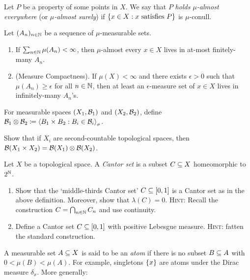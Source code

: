 \documentclass[reqno, twoside]{article}
\begin{document}
    Let $P$ be a property of some points in $X$. We say that $P$ \textit{holds $\mu$-almost everywhere} (or \textit{$\mu$-almost surely}) if $\left\{x\in X: x\textrm{ satisfies }P\right\}$ is $\mu$-conull.

    \begin{exercise}
        Let $(A_n)_{n\in\mathbb{N}}$ be a sequence of $\mu$-measurable sets.
        \begin{enumerate}
            \item If $\sum_{n\in\mathbb{N}}\mu(A_n)<\infty$, then $\mu$-almost every $x\in X$ lives in at-most finitely-many $A_n$.
                \vspace{-0.05in}
            \item (Measure Compactness). If $\mu(X)<\infty$ and there exists $\epsilon>0$ such that $\mu(A_n)\geq\epsilon$ for all $n\in\mathbb{N}$, then at least an $\epsilon$-measure set of $x\in X$ lives in infinitely-many $A_n$'s.
        \end{enumerate}
    \end{exercise}

    For measurable spaces $(X_1,\mathcal{B}_1)$ and $(X_2,\mathcal{B}_2)$, define $\mathcal{B}_1\otimes\mathcal{B}_2\coloneqq\left\langle B_1\times B_2: B_i\in\mathcal{B}_i\right\rangle_\sigma$.

    \begin{exercise}
         Show that if $X_i$ are second-countable topological spaces, then $\mathcal{B}(X_1\times X_2)=\mathcal{B}(X_1)\otimes\mathcal{B}(X_2)$.
     \end{exercise}

    \begin{exercise}
        Let $X$ be a topological space. A \textit{Cantor set} is a subset $C\subseteq X$ homeomorphic to $2^{\mathbb{N}}$.
        \begin{enumerate}
            \item Show that the `middle-thirds Cantor set' $C\subseteq[0,1]$ is a Cantor set as in the above definition. Moreover, show that $\lambda(C)=0$. \textsc{Hint:} Recall the construction $C=\bigcap_{n\in\mathbb{N}}C_n$ and use continuity.
                \vspace{-0.05in}
            \item Define a Cantor set $C\subseteq[0,1]$ with positive Lebesgue measure. \textsc{Hint:} fatten the standard construction.
        \end{enumerate}
    \end{exercise}

    A measurable set $A\subseteq X$ is said to be an \textit{atom} if there is no subset $B\subseteq A$ with $0<\mu(B)<\mu(A)$. For example, singletons $\left\{x\right\}$ are atoms under the Dirac measure $\delta_x$. More generally:
\end{document}
